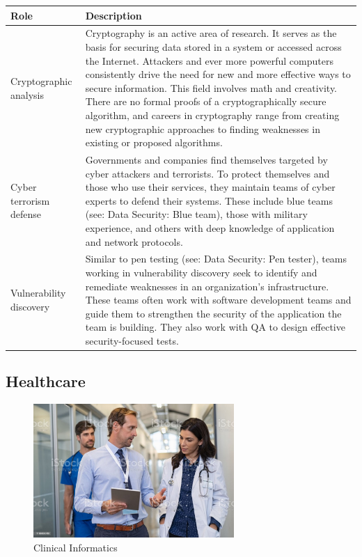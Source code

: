 \begin{table}[H]
	\begin{center}
		\begin{tabular}{p{1in}|p{3.4in}} 
			\textbf{Role} & \textbf{Description}\\
			\hline
			Cryptographic analysis & Cryptography is an active area of research. It serves as the basis for securing data stored in a system or accessed across the Internet. Attackers and ever more powerful computers consistently drive the need for new and more effective ways to secure information. This field involves math and creativity. There are no formal proofs of a cryptographically secure algorithm, and careers in cryptography range from creating new cryptographic approaches to finding weaknesses in existing or proposed algorithms.\\
			\hline
			Cyber terrorism defense & Governments and companies find themselves targeted by cyber attackers and terrorists. To protect themselves and those who use their services, they maintain teams of cyber experts to defend their systems. These include blue teams (see: Data Security: Blue team), those with military experience, and others with deep knowledge of application and network protocols.\\
			\hline
			Vulnerability discovery & Similar to pen testing (see: Data Security: Pen tester), teams working in vulnerability discovery seek to identify and remediate weaknesses in an organization's infrastructure. These teams often work with software development teams and guide them to strengthen the security of the application the team is building. They also work with QA to design effective security-focused tests.\\
			\hline
		\end{tabular}
	\end{center}
\end{table}

\subsection{Healthcare}

\begin{figure}[H]
	\begin{center}
		\caption{Clinical Informatics}
		\vskip 4pt
		\includegraphics[height=2in]{images/careers/istockphoto-1189303763-1024x1024.jpg}
	\end{center}
\end{figure}


